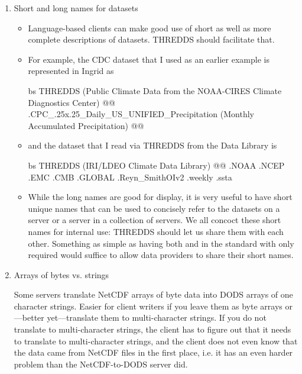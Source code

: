 \begin{enumerate}
  \item Short and long names for datasets

    \begin{itemize}
       
    \item Language-based clients can make good use of short as well as
      more complete descriptions of datasets. THREDDS should
      facilitate that.
      
    \item For example, the CDC dataset that I used as an earlier
      example is represented in Ingrid as


\begin{vcode}{bs} 
 THREDDS
  (Public Climate Data from the NOAA-CIRES Climate Diagnostics Center) @@
  .CPC\_.25x.25\_Daily\_US\_UNIFIED\_Precipitation
  (Monthly Accumulated Precipitation) @@
\end{vcode}

     \item and the dataset that I read via THREDDS from the Data
     Library is  

\begin{vcode}{bs} 
 THREDDS
  (IRI/LDEO Climate Data Library) @@
  .NOAA .NCEP .EMC .CMB .GLOBAL .Reyn\_SmithOIv2 .weekly .ssta
\end{vcode}
     
   \item While the long names are good for display, it is very useful
     to have short unique names that can be used to concisely refer to
     the datasets on a server or a server in a collection of servers.
     We all concoct these short names for internal use: THREDDS should
     let us share them with each other. Something as simple as having
     both  and  in the standard with only
      required would suffice to allow data providers to
     share their short names. 


   \end{itemize}

 \item  Arrays of bytes vs. strings

   
   Some servers translate NetCDF arrays of byte data into DODS arrays
   of one character strings. Easier for client writers if you leave
   them as byte arrays or---better yet---translate them to multi-character
   strings.  If you do not translate to multi-character strings, the
   client has to figure out that it needs to translate to
   multi-character strings, and the client does not even know that the
   data came from NetCDF files in the first place, i.e. it has an even
   harder problem than the NetCDF-to-DODS server did.

\end{enumerate}

%
%
%
%

